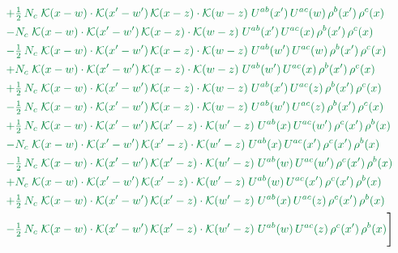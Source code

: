 \documentclass[10pt]{article}
\numberwithin{equation}{section}
\begin{document}
\begin{align}
&\quad{\color{JIM}+\tfrac{1}{2}\,N_c\;\mathcal{K}(x-w)\cdot\mathcal{K}(x'-w')\,\mathcal{K}(x-z)\cdot\mathcal{K}(w-z)\;U^{ab}(x')\,U^{ac}(w)\,\rho^{b}(x')\,\rho^{c}(x)}\notag\\
&\quad{\color{JIM}-N_c\;\mathcal{K}(x-w)\cdot\mathcal{K}(x'-w')\,\mathcal{K}(x-z)\cdot\mathcal{K}(w-z)\;U^{ab}(x')\,U^{ac}(x)\,\rho^{b}(x')\,\rho^{c}(x)}\notag\\
&\quad{\color{JIM}-\tfrac{1}{2}\,N_c\;\mathcal{K}(x-w)\cdot\mathcal{K}(x'-w')\,\mathcal{K}(x-z)\cdot\mathcal{K}(w-z)\;U^{ab}(w')\,U^{ac}(w)\,\rho^{b}(x')\,\rho^{c}(x)}\notag\\
&\quad{\color{JIM}+N_c\;\mathcal{K}(x-w)\cdot\mathcal{K}(x'-w')\,\mathcal{K}(x-z)\cdot\mathcal{K}(w-z)\;U^{ab}(w')\,U^{ac}(x)\,\rho^{b}(x')\,\rho^{c}(x)}\notag\\
&\quad{\color{JIM}+\tfrac{1}{2}\,N_c\;\mathcal{K}(x-w)\cdot\mathcal{K}(x'-w')\,\mathcal{K}(x-z)\cdot\mathcal{K}(w-z)\;U^{ab}(x')\,U^{ac}(z)\,\rho^{b}(x')\,\rho^{c}(x)}\notag\\
&\quad{\color{JIM}-\tfrac{1}{2}\,N_c\;\mathcal{K}(x-w)\cdot\mathcal{K}(x'-w')\,\mathcal{K}(x-z)\cdot\mathcal{K}(w-z)\;U^{ab}(w')\,U^{ac}(z)\,\rho^{b}(x')\,\rho^{c}(x)}\notag\\
&\quad{\color{JIM}+\tfrac{1}{2}\,N_c\;\mathcal{K}(x-w)\cdot\mathcal{K}(x'-w')\,\mathcal{K}(x'-z)\cdot\mathcal{K}(w'-z)\;U^{ab}(x)\,U^{ac}(w')\,\rho^{c}(x')\,\rho^{b}(x)}\notag\\
&\quad{\color{JIM}-N_c\;\mathcal{K}(x-w)\cdot\mathcal{K}(x'-w')\,\mathcal{K}(x'-z)\cdot\mathcal{K}(w'-z)\;U^{ab}(x)\,U^{ac}(x')\,\rho^{c}(x')\,\rho^{b}(x)}\notag\\
&\quad{\color{JIM}-\tfrac{1}{2}\,N_c\;\mathcal{K}(x-w)\cdot\mathcal{K}(x'-w')\,\mathcal{K}(x'-z)\cdot\mathcal{K}(w'-z)\;U^{ab}(w)\,U^{ac}(w')\,\rho^{c}(x')\,\rho^{b}(x)}\notag\\
&\quad{\color{JIM}+N_c\;\mathcal{K}(x-w)\cdot\mathcal{K}(x'-w')\,\mathcal{K}(x'-z)\cdot\mathcal{K}(w'-z)\;U^{ab}(w)\,U^{ac}(x')\,\rho^{c}(x')\,\rho^{b}(x)}\notag\\
&\quad{\color{JIM}+\tfrac{1}{2}\,N_c\;\mathcal{K}(x-w)\cdot\mathcal{K}(x'-w')\,\mathcal{K}(x'-z)\cdot\mathcal{K}(w'-z)\;U^{ab}(x)\,U^{ac}(z)\,\rho^{c}(x')\,\rho^{b}(x)}\notag\\
&\quad{\color{JIM}-\tfrac{1}{2}\,N_c\;\mathcal{K}(x-w)\cdot\mathcal{K}(x'-w')\,\mathcal{K}(x'-z)\cdot\mathcal{K}(w'-z)\;U^{ab}(w)\,U^{ac}(z)\,\rho^{c}(x')\,\rho^{b}(x)}\Bigg]\label{eq:gen2}
\end{align}
\end{document}
